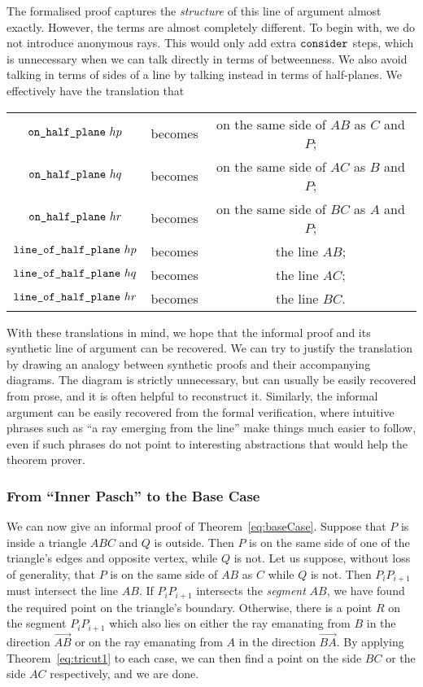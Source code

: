 The formalised proof captures the \emph{structure} of this line of argument almost exactly. However, the terms are almost completely different. To begin with, we do not introduce anonymous rays. This would only add extra $\texttt{consider}$ steps, which is unnecessary when we can talk directly in terms of betweenness. We also avoid talking in terms of sides of a line by talking instead in terms of half-planes. We effectively have the translation that

\begin{tabular}{ccc}
  $\texttt{on\_half\_plane}\ hp$ & becomes & on the same side of $AB$ as $C$ and $P$;\\
  $\texttt{on\_half\_plane}\ hq$ & becomes & on the same side of $AC$ as $B$ and $P$;\\
  $\texttt{on\_half\_plane}\ hr$ & becomes & on the same side of $BC$ as $A$ and $P$;\\
  $\texttt{line\_of\_half\_plane}\ hp$ & becomes & the line $AB$; \\
  $\texttt{line\_of\_half\_plane}\ hq$ & becomes & the line $AC$; \\ 
  $\texttt{line\_of\_half\_plane}\ hr$ & becomes & the line $BC$. \\
\end{tabular}

With these translations in mind, we hope that the informal proof and its synthetic line of argument can be  recovered. We can try to justify the translation by drawing an analogy between synthetic proofs and their accompanying diagrams. The diagram is strictly unnecessary, but can usually be easily recovered from prose, and it is often helpful to reconstruct it. Similarly, the informal argument can be easily recovered from the formal verification, where intuitive phrases such as ``a ray emerging from the line'' make things much easier to follow, even if such phrases do not point to interesting abstractions that would help the theorem prover.

\subsubsection{From ``Inner Pasch'' to the Base Case}\label{sec:JordanBaseCase1}
We can now give an informal proof of Theorem~\ref{eq:baseCase}. Suppose that $P$ is inside a triangle $ABC$ and $Q$ is outside. Then $P$ is on the same side of one of the triangle's edges and opposite vertex, while $Q$ is not. Let us suppose, without loss of generality, that $P$ is on the same side of $AB$ as $C$ while $Q$ is not. Then $P_iP_{i+1}$ must intersect the line $AB$. If $P_iP_{i+1}$ intersects the \emph{segment} $AB$, we have found the required point on the triangle's boundary. Otherwise, there is a point $R$ on the segment $P_iP_{i+1}$ which also lies on either the ray emanating from $B$ in the direction $\overrightarrow{AB}$ or on the ray emanating from $A$ in the direction $\overrightarrow{BA}$. By applying Theorem~\ref{eq:tricut1} to each case, we can then find a point on the side $BC$ or the side $AC$ respectively, and we are done.

